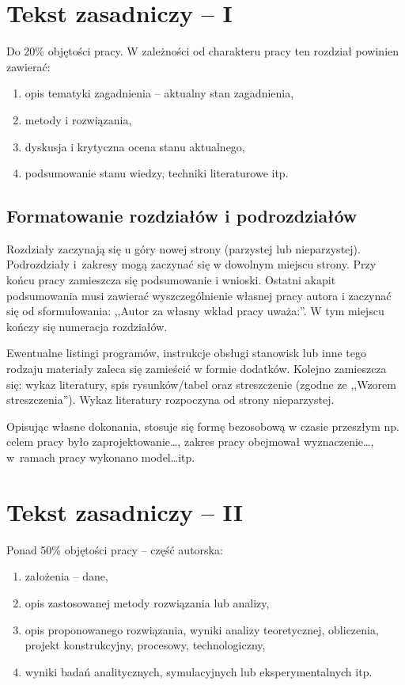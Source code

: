 \documentclass[12pt,twoside]{article}
\begin{document}
\section{Tekst zasadniczy -- I}

Do 20\% objętości pracy. W zależności od charakteru pracy ten rozdział powinien zawierać:
\begin{enumerate}[label=\alph*), leftmargin=1.25cm]
	\item opis tematyki zagadnienia -- aktualny stan zagadnienia,
	\item metody i rozwiązania,
	\item dyskusja i krytyczna ocena stanu aktualnego,
	\item podsumowanie stanu wiedzy, techniki literaturowe itp.
\end{enumerate}

\subsection{Formatowanie rozdziałów i podrozdziałów}
Rozdziały zaczynają się u góry nowej strony (parzystej lub nieparzystej).
Podrozdziały i~zakresy mogą zaczynać się w dowolnym miejscu strony.
Przy końcu pracy zamieszcza się podsumowanie i wnioski. Ostatni akapit podsumowania musi zawierać wyszczególnienie własnej pracy autora i zaczynać się od sformułowania: ,,Autor za własny wkład pracy uważa:''.
W tym miejscu kończy się numeracja rozdziałów.

Ewentualne listingi programów, instrukcje obsługi stanowisk lub inne tego rodzaju materiały zaleca się zamieścić w formie dodatków.
Kolejno zamieszcza się: wykaz literatury, spis rysunków/tabel oraz streszczenie (zgodne ze ,,Wzorem streszczenia'').
Wykaz literatury rozpoczyna od strony nieparzystej.

Opisując własne dokonania, stosuje się formę bezosobową w czasie przeszłym np. celem pracy było zaprojektowanie\ldots, zakres pracy obejmował wyznaczenie\ldots, w~ramach pracy wykonano model\ldots itp.

\section{Tekst zasadniczy -- II}

Ponad 50\% objętości pracy -- część autorska:
\begin{enumerate}[label=\alph*), leftmargin=1.25cm] 
	\item założenia -- dane,
	\item opis zastosowanej metody rozwiązania lub analizy,
	\item opis proponowanego rozwiązania, wyniki analizy teoretycznej, obliczenia, projekt konstrukcyjny, procesowy, technologiczny,
	\item wyniki badań analitycznych, symulacyjnych lub eksperymentalnych itp.
\end{enumerate}
\end{document}
